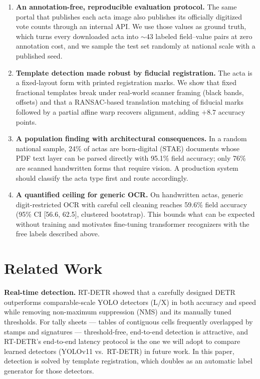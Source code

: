 \documentclass[conference]{IEEEtran}
\begin{document}
\begin{enumerate}
\item \textbf{An annotation-free, reproducible evaluation protocol.} The same
portal that publishes each acta image also publishes its officially digitized
vote counts through an internal API. We use those values as ground truth,
which turns every downloaded acta into ${\sim}43$ labeled field--value pairs
at zero annotation cost, and we sample the test set randomly at national
scale with a published seed.
\item \textbf{Template detection made robust by fiducial registration.} The
acta is a fixed-layout form with printed registration marks. We show that
fixed fractional templates break under real-world scanner framing (black
bands, offsets) and that a RANSAC-based translation matching of fiducial
marks followed by a partial affine warp recovers alignment, adding $+8.7$
accuracy points.
\item \textbf{A population finding with architectural consequences.} In a
random national sample, 24\% of actas are born-digital (STAE) documents whose
PDF text layer can be parsed directly with 95.1\% field accuracy; only 76\%
are scanned handwritten forms that require vision. A production system should
classify the acta type first and route accordingly.
\item \textbf{A quantified ceiling for generic OCR.} On handwritten actas,
generic digit-restricted OCR with careful cell cleaning reaches 59.6\% field
accuracy (95\% CI [56.6, 62.5], clustered bootstrap). This bounds what can be
expected without training and motivates fine-tuning transformer recognizers
with the free labels described above.
\end{enumerate}

\section{Related Work}
\textbf{Real-time detection.} RT-DETR \cite{rtdetr} showed that a carefully
designed DETR outperforms comparable-scale YOLO detectors (L/X) in both
accuracy and speed while
removing non-maximum suppression (NMS) and its manually tuned thresholds. For
tally sheets --- tables of contiguous cells frequently overlapped by stamps
and signatures --- threshold-free, end-to-end detection is attractive, and
RT-DETR's end-to-end latency protocol is the one we will adopt to compare
learned detectors (YOLOv11 vs.\ RT-DETR) in future work. In this paper, detection is
solved by template registration, which doubles as an automatic label
generator for those detectors.
\end{document}
